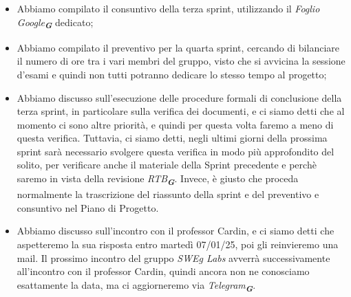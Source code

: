 \begin{itemize}
    \item Abbiamo compilato il consuntivo della terza sprint, utilizzando il \emph{Foglio Google}\textsubscript{\textit{\textbf{G}}} dedicato;
    \item Abbiamo compilato il preventivo per la quarta sprint, cercando di bilanciare il numero di ore tra i vari membri del gruppo,
    visto che si avvicina la sessione d'esami e quindi non tutti potranno dedicare lo stesso tempo al progetto;
    \item Abbiamo discusso sull'esecuzione delle procedure formali di conclusione della terza sprint, in particolare sulla verifica
    dei documenti, e ci siamo detti che al momento ci sono altre priorità, e quindi per questa volta faremo a meno di questa verifica. 
    Tuttavia, ci siamo detti, negli ultimi giorni della prossima sprint sarà necessario svolgere questa verifica in modo più
    approfondito del solito, per verificare anche il materiale della Sprint precedente e perchè saremo in vista della revisione
    \emph{RTB}\textsubscript{\textit{\textbf{G}}}. Invece, è giusto che proceda normalmente la trascrizione del
    riassunto della sprint e del preventivo e consuntivo nel Piano di Progetto.
    \item Abbiamo discusso sull'incontro con il professor Cardin, e ci siamo detti che aspetteremo la sua risposta entro martedì
    07/01/25, poi gli reinvieremo una mail. Il prossimo incontro del gruppo \emph{SWEg Labs} avverrà successivamente all'incontro con il professor
    Cardin, quindi ancora non ne conosciamo esattamente la data, ma ci aggiorneremo via \emph{Telegram}\textsubscript{\textit{\textbf{G}}}.
 \end{itemize}
